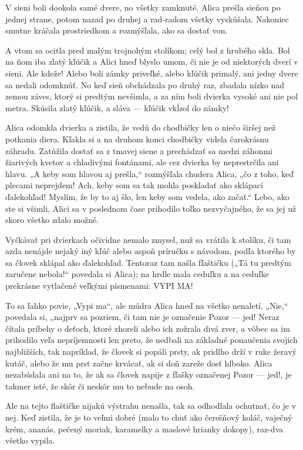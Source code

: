 \documentclass[12pt]{book}
\begin{document}
\begin{Parallel}[p]{}{}
{V sieni boli dookola samé dvere, no všetky zamknuté. Alica prešla sieňou po jednej strane, potom nazad po druhej a rad-radom všetky vyskúšala. Nakoniec smutne kráčala prostriedkom a rozmýšľala, ako sa dostať von.

A vtom sa ocitla pred malým trojnohým stolíkom; celý bol z hrubého skla. Bol na ňom iba zlatý kľúčik a Alici hneď blyslo umom, či nie je od niektorých dverí v sieni. Ale kdeže! Alebo boli zámky priveľké, alebo kľúčik primalý, ani jedny dvere sa nedali odomknúť. No keď sieň obchádzala po druhý raz, zbadala nízko nad zemou záves, ktorý si predtým nevšimla, a za ním boli dvierka vysoké ani nie pol metra. Skúsila zlatý kľúčik, a sláva — kľúčik vkĺzol do zámky!

Alica odomkla dvierka a zistila, že vedú do chodbičky len o niečo širšej než potkania diera. Kľakla si a na druhom konci chodbičky videla čarokrásnu záhradu. Zatúžila dostať sa z tmavej siene a prechádzať sa medzi záhonmi žiarivých kvetov a chladivými fontánami, ale cez dvierka by neprestrčila ani hlavu. „A keby som hlavou aj prešla,“ rozmýšľala chudera Alica, „čo z toho, keď plecami neprejdem! Ach, keby som sa tak mohla poskladať ako sklápací ďalekohľad! Myslím, že by to aj šlo, len keby som vedela, ako začať.“ Lebo, ako ste si všimli, Alici sa v poslednom čase prihodilo toľko nezvyčajného, že sa jej už skoro všetko zdalo možné.

Vyčkávať pri dvierkach očividne nemalo zmysel, nuž sa vrátila k stolíku, či tam azda nenájde nejaký iný kľúč alebo aspoň príručku s návodom, podľa ktorého by sa človek sklápal ako ďalekohľad. Tentoraz tam našla fľaštičku („Tá tu predtým zaručene nebola!“ povedala si Alica); na hrdle mala ceduľku a na ceduľke prekrásne vytlačené veľkými písmenami: VYPI MA!

To sa ľahko povie, „Vypi ma“, ale múdra Alica hneď na všetko nenaletí. „Nie,“ povedala si, „najprv sa pozriem, či tam nie je označenie Pozor — jed! Neraz čítala príbehy o deťoch, ktoré zhoreli alebo ich zožrala divá zver, a vôbec sa im prihodilo veľa nepríjemnosti len preto, že nedbali na základné ponaučenia svojich najbližších, tak napríklad, že človek si popáli prsty, ak pridlho drží v ruke žeravý kutáč, alebo že mu prst začne krvácať, ak si doň zareže dosť hlboko. Alica nezabúdala ani na to, že ak sa človek napije z fľašky označenej Pozor — jed!, je takmer isté, že skôr či neskôr mu to nebude na osoh.

Ale na tejto flaštičke nijakú výstrahu nenašla, tak sa odhodlala ochutnať, čo je v nej. Keď zistila, že je to veľmi dobré (malo to chuť ako čerešňový koláč, vaječný krém, ananás, pečený moriak, karamelky a maslové hrianky dokopy), raz-dva všetko vypila.

}
\end{Parallel}
\end{document}
